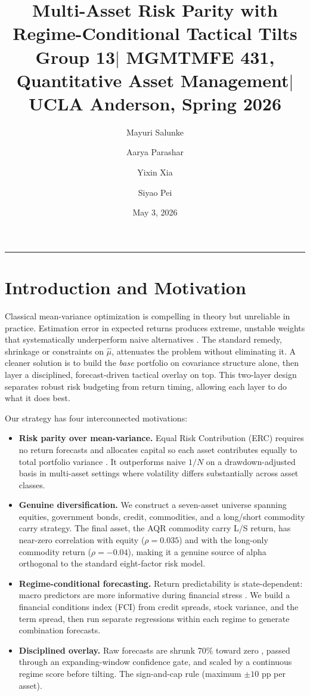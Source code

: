 \documentclass[11pt,letterpaper]{article}
\title{%
  \vspace{-1.8em}%
  {\color{navy}\textbf{\large Multi-Asset Risk Parity with Regime-Conditional Tactical Tilts}}\\[5pt]
  \normalsize\mdseries\color{black}
  Group 13\enspace$|$\enspace
  MGMTMFE 431, Quantitative Asset Management\enspace$|$\enspace
  UCLA Anderson, Spring 2026
}
\author{Mayuri Salunke \and Aarya Parashar \and Yixin Xia \and Siyao Pei}
\date{\normalsize May 3, 2026}
\begin{document}
\maketitle
\vspace{-14pt}
{\color{midblue}\rule{\linewidth}{1.5pt}}
\vspace{4pt}

\section{Introduction and Motivation}

Classical mean-variance optimization is compelling in theory but unreliable in
practice. Estimation error in expected returns produces extreme, unstable weights
that systematically underperform naive alternatives \citep{DeMiguel2009,Michaud1989}.
The standard remedy, shrinkage or constraints on $\hat{\mu}$, attenuates the
problem without eliminating it. A cleaner solution is to build the \emph{base}
portfolio on covariance structure alone, then layer a disciplined, forecast-driven
tactical overlay on top. This two-layer design separates robust risk budgeting from
return timing, allowing each layer to do what it does best.

Our strategy has four interconnected motivations:

\begin{itemize}[leftmargin=1.4em,itemsep=2pt,topsep=4pt]
  \item \textbf{Risk parity over mean-variance.} Equal Risk Contribution (ERC)
    requires no return forecasts and allocates capital so each asset contributes
    equally to total portfolio variance \citep{Maillard2010}. It outperforms naive
    $1/N$ on a drawdown-adjusted basis in multi-asset settings where volatility
    differs substantially across asset classes.
  \item \textbf{Genuine diversification.} We construct a seven-asset universe
    spanning equities, government bonds, credit, commodities, and a long/short
    commodity carry strategy. The final asset, the AQR commodity carry L/S return,
    has near-zero correlation with equity ($\rho = 0.035$) and with the long-only
    commodity return ($\rho = -0.04$), making it a genuine source of alpha
    orthogonal to the standard eight-factor risk model.
  \item \textbf{Regime-conditional forecasting.} Return predictability is
    state-dependent: macro predictors are more informative during financial stress
    \citep{Adrian2019,Cenesizoglu2012}. We build a financial conditions index (FCI)
    from credit spreads, stock variance, and the term spread, then run separate
    regressions within each regime to generate combination forecasts.
  \item \textbf{Disciplined overlay.} Raw forecasts are shrunk 70\% toward zero
    \citep{CampbellThompson2008}, passed through an expanding-window confidence
    gate, and scaled by a continuous regime score before tilting. The sign-and-cap
    rule (maximum $\pm 10$ pp per asset).
\end{itemize}
\end{document}
